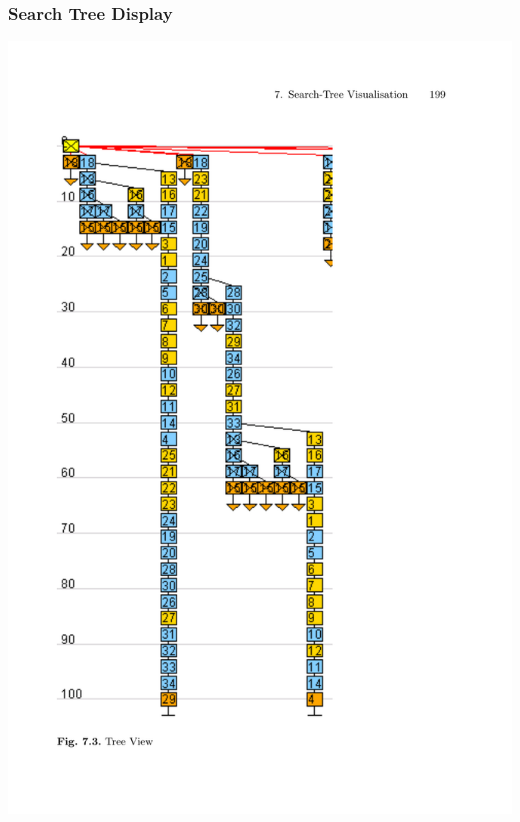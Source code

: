 \begin{frame}
  \frametitle{Search Tree Display %
  \cite{DBLP:conf/discipl/SimonisA00} \cite{DBLP:journals/constraints/FagesSC04}}
  
  \includegraphics[height=0.8\textheight]{images/simonis_aggoun_tree.pdf}

\end{frame}
